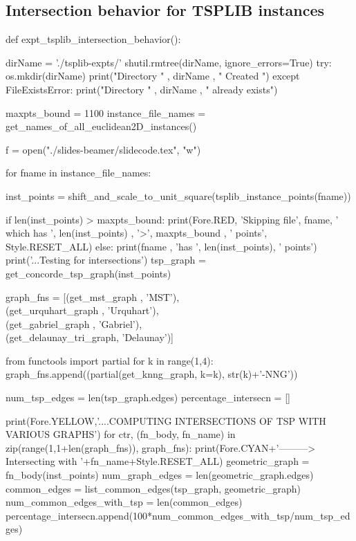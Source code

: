 \subsection{Intersection behavior for TSPLIB instances}
\nwenddocs{}\endmoddef\nwstartdeflinemarkup{}\nwenddeflinemarkup
def expt_tsplib_intersection_behavior():
 
     dirName = './tsplib-expts/'
     shutil.rmtree(dirName, ignore_errors=True)
     try:
         os.mkdir(dirName)
         print("Directory " , dirName ,  " Created ") 
     except FileExistsError:
         print("Directory " , dirName ,  " already exists")
    
     maxpts_bound        = 1100
     instance_file_names = get_names_of_all_euclidean2D_instances()

     f = open("./slides-beamer/slidecode.tex", "w")

     for fname in instance_file_names:

        inst_points = shift_and_scale_to_unit_square(tsplib_instance_points(fname))

        if len(inst_points) > maxpts_bound:
              print(Fore.RED, 'Skipping file', fname, ' which has ', len(inst_points) , '>', maxpts_bound , ' points', Style.RESET_ALL)
        else:
              print(fname , 'has ', len(inst_points), ' points')
              print('...Testing for intersections')
              tsp_graph = get_concorde_tsp_graph(inst_points)
              
              graph_fns = [(get_mst_graph         , 'MST'), \\
                           (get_urquhart_graph    , 'Urquhart'), \\
                           (get_gabriel_graph     , 'Gabriel'),\\
                           (get_delaunay_tri_graph, 'Delaunay')]

              from functools import partial
              for k in range(1,4): 
                     graph_fns.append((partial(get_knng_graph, k=k), str(k)+'-NNG'))

              num_tsp_edges        = len(tsp_graph.edges)
              percentage_intersecn = []  
     
              print(Fore.YELLOW,'....COMPUTING INTERSECTIONS OF TSP WITH VARIOUS GRAPHS')
              for ctr, (fn_body, fn_name) in zip(range(1,1+len(graph_fns)), graph_fns):
                      print(Fore.CYAN+'---------> Intersecting with '+fn_name+Style.RESET_ALL)
                      geometric_graph           = fn_body(inst_points)
                      num_graph_edges           = len(geometric_graph.edges)
                      common_edges              = list_common_edges(tsp_graph, geometric_graph)
                      num_common_edges_with_tsp = len(common_edges)
                      percentage_intersecn.append(100*num_common_edges_with_tsp/num_tsp_edges)

